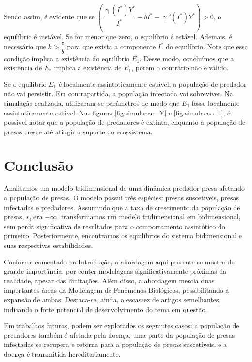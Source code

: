 \documentclass{article}
\begin{document}
Sendo assim, é evidente que se $\left( \dfrac{\upgamma(I^*)Y^*}{I^*} - b I^* -  \upgamma'(I^*) Y^* \right) > 0$, o equilíbrio é instável. Se for menor que zero, o equilíbrio é estável. Ademais, é necessário que $k > \dfrac{c}{b}$ para que exista a componente $I^*$ do equilíbrio. Note que essa condição implica a existência do equilíbrio $E_1$. Desse modo, concluímos que a existência de $E_*$ implica a existência de $E_1$, porém o contrário não é válido.

Se o equilíbrio $E_1$ é localmente assintoticamente estável, a população de predador não vai persistir. Em contrapartida, a população infectada vai sobreviver. Na simulação realizada, utilizaram-se parâmetros de modo que $E_1$ fosse localmente assintoticamente estável. Nas figuras \ref{fig:simulacao_Y} e \ref{fig:simulacao_I}, é possível notar que a população de predadores é extinta, enquanto a população de presas cresce até atingir o suporte do ecossistema.

\section{Conclusão}
Analisamos um modelo tridimensional de uma dinâmica predador-presa afetando a população de presas. O modelo possui três espécies: presas suscetíveis, presas infectadas e predadores. Assumindo que a taxa de crescimento da população de presas, $r$, era $+ \infty$, transformamos um modelo tridimensional em bidimensional, sem perda significativa de resultados para o comportamento assintótico do primeiro. Posteriormente, encontramos os equilíbrios do sistema bidimensional e suas respectivas estabilidades.

Conforme comentado na Introdução, a abordagem aqui presente se mostra de grande importância, por conter modelagens significativamente próximas da realidade, apesar das limitações. Além disso, a abordagem mescla duas importantes áreas da Modelagem de Fenômenos Biológicos, possibilitando a expansão de ambas. Destaca-se, ainda, a escassez de artigos semelhantes, indicando o forte potencial de desenvolvimento do tema em questão.

Em trabalhos futuros, podem ser explorados os seguintes casos: a população de predadores também é afetada pela doença, uma parte da população de presas infectadas se recupera e retorna para a população de presas suscetíveis, e a doença é transmitida hereditariamente. 
\printbibliography
\end{document}
